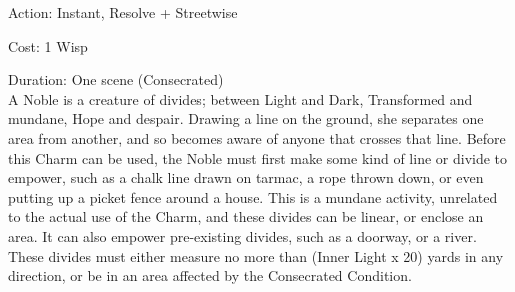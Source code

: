 \noindent Action: Instant, Resolve + Streetwise

\noindent Cost: 1 Wisp

\noindent Duration: One scene (Consecrated)\\

\noindent A Noble is a creature of divides; between Light and Dark, Transformed and mundane, Hope and despair. Drawing a line on the ground, she separates one area from another, and so becomes aware of anyone that crosses that line. Before this Charm can be used, the Noble must first make some kind of line or divide to empower, such as a chalk line drawn on tarmac, a rope thrown down, or even putting up a picket fence around a house. This is a mundane activity, unrelated to the actual use of the Charm, and these divides can be linear, or enclose an area. It can also empower pre-existing divides, such as a doorway, or a river. These divides must either measure no more than (Inner Light x 20) yards in any direction, or be in an area affected by the Consecrated Condition.

